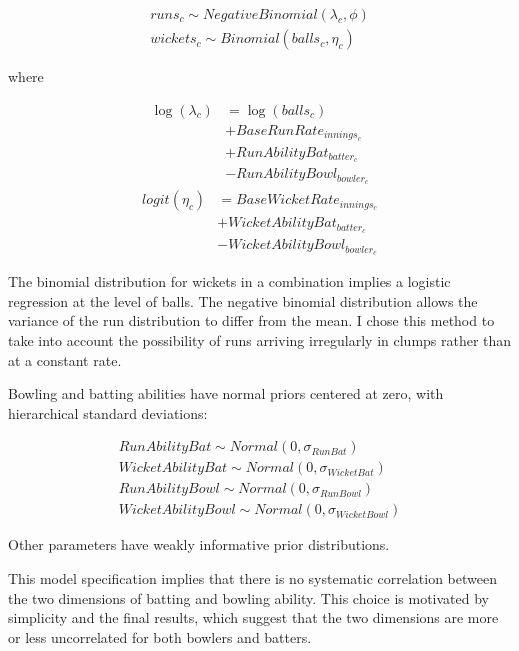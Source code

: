 \documentclass[11pt]{article}
\begin{document}
\begin{gather}
\nonumber runs_{c} \sim NegativeBinomial(\lambda_{c}, \phi) \\ \nonumber
wickets_{c} \sim Binomial(balls_c, \eta_{c}) 
\end{gather}

where

\begin{align}
\nonumber\log(\lambda_{c}) &= \log(balls_{c}) \\ \nonumber &+
BaseRunRate_{innings_c} \\ \nonumber &+ RunAbilityBat_{batter_c} \\ \nonumber &-
RunAbilityBowl_{bowler_c} \end{align}
\begin{align}
\nonumber logit(\eta_{c}) &= BaseWicketRate_{innings_c} \\ \nonumber &+
WicketAbilityBat_{batter_c} \\ \nonumber &- WicketAbilityBowl_{bowler_c}
\end{align}

The binomial distribution for wickets in a combination implies a
logistic regression at the level of balls. The negative binomial
distribution allows the variance of the run distribution to differ
from the mean. I chose this method to take into account the
possibility of runs arriving irregularly in clumps rather than at a
constant rate.

Bowling and batting abilities have normal priors centered at zero, with
hierarchical standard deviations:

\begin{align}
\nonumber RunAbilityBat \sim Normal(0, \sigma_{RunBat}) \\ \nonumber
WicketAbilityBat \sim Normal(0, \sigma_{WicketBat}) \\ \nonumber RunAbilityBowl
\sim Normal(0, \sigma_{RunBowl}) \\ \nonumber WicketAbilityBowl \sim Normal(0,
\sigma_{WicketBowl}) \end{align}

Other parameters have weakly informative prior distributions.

This model specification implies that there is no systematic
correlation between the two dimensions of batting and bowling
ability. This choice is motivated by simplicity and the final results,
which suggest that the two dimensions are more or less uncorrelated
for both bowlers and batters.
\end{document}
